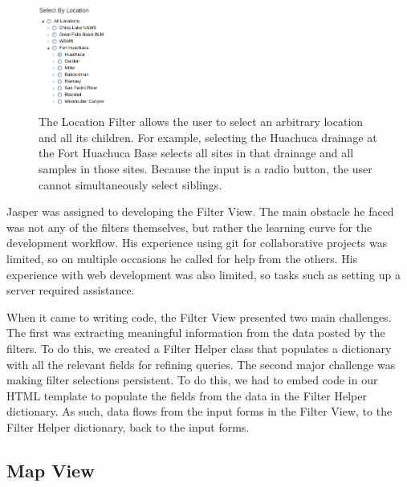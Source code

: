 \documentclass[10pt,draftclsnofoot,onecolumn]{IEEEtran}
\begin{document}
\begin{figure}[h]
\centering
\includegraphics[width=0.25\textwidth]{images/location_filter.png}
\captionsetup{justification=centering}
\caption{
  The Location Filter allows the user to select an arbitrary location and all its children.
  For example, selecting the Huachuca drainage at the Fort Huachuca Base selects all sites in that drainage and all samples in those sites.
  Because the input is a radio button, the user cannot simultaneously select siblings.
}
\label{fig:location_filter}
\end{figure}

Jasper was assigned to developing the Filter View.
The main obstacle he faced was not any of the filters themselves, but rather the learning curve for the development workflow.
His experience using git for collaborative projects was limited, so on multiple occasions he called for help from the others.
His experience with web development was also limited, so tasks such as setting up a server required assistance.

When it came to writing code, the Filter View presented two main challenges.
The first was extracting meaningful information from the data posted by the filters.
To do this, we created a Filter Helper class that populates a dictionary with all the relevant fields for refining queries.
The second major challenge was making filter selections persistent.
To do this, we had to embed code in our HTML template to populate the fields from the data in the Filter Helper dictionary.
As such, data flows from the input forms in the Filter View, to the Filter Helper dictionary, back to the input forms.

\subsection{Map View}
\end{document}
